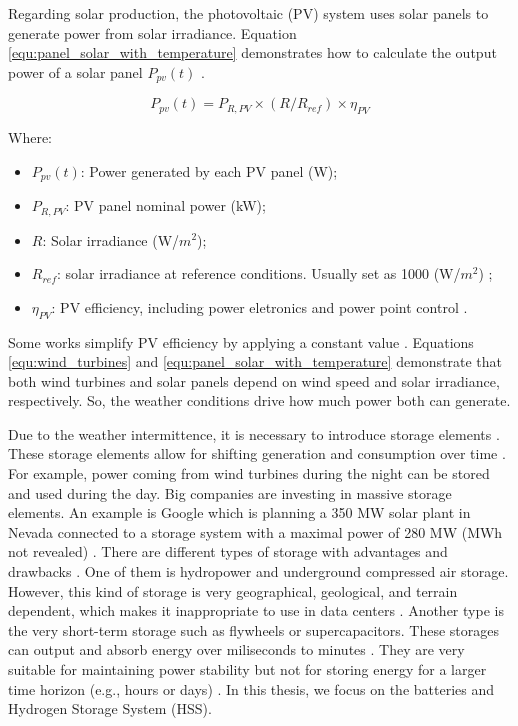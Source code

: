 Regarding solar production, the photovoltaic (PV) system uses solar panels to generate power from solar irradiance. Equation \ref{equ:panel_solar_with_temperature} demonstrates how to calculate the output power of a solar panel $P_{pv}(t)$ \cite{maleki2015optimal, sinha2015review, dong2016optimal}.

\begin{equation}
    \label{equ:panel_solar_with_temperature}
    P_{pv}(t) = P_{R,PV} \times (R / R_{ref}) \times \eta_{PV}
\end{equation}

Where:
\begin{itemize}
    \item $P_{pv}(t)$: Power generated by each PV panel (W);
    \item $P_{R,PV}$: PV panel nominal power (kW);
    \item $R$: Solar irradiance (W/$m^{2}$);
    \item $R_{ref}$: solar irradiance at reference conditions. Usually set as 1000 (W/$m^{2}$) \cite{dong2016optimal};
    \item $\eta_{PV}$: PV efficiency, including power eletronics and power point control \cite{sinha2015review, maleki2015optimal}.
\end{itemize}

Some works simplify PV efficiency by applying a constant value \cite{dong2016optimal, haddad2019mixed}. Equations \ref{equ:wind_turbines} and \ref{equ:panel_solar_with_temperature} demonstrate that both wind turbines and solar panels depend on wind speed and solar irradiance, respectively. So, the weather conditions drive how much power both can generate. 

Due to the weather intermittence, it is necessary to introduce storage elements \cite{hernandez2019techno}. These storage elements allow for shifting generation and consumption over time \cite{rostirolla2022survey}. For example, power coming from wind turbines during the night can be stored and used during the day. Big companies are investing in massive storage elements. An example is Google which is planning a 350 MW solar plant in Nevada connected to a storage system with a maximal power of 280 MW (MWh not revealed) \cite{branscombe2020google}. There are different types of storage with advantages and drawbacks \cite{wang2012energy}. One of them is hydropower and underground compressed air storage. However, this kind of storage is very geographical, geological, and terrain dependent, which makes it inappropriate to use in data centers \cite{rostirolla2022survey}. Another type is the very short-term storage such as flywheels or supercapacitors. These storages can output and absorb energy over miliseconds to minutes \cite{wang2012energy}. They are very suitable for maintaining power stability but not for storing energy for a larger time horizon (e.g., hours or days) \cite{rostirolla2022survey}. In this thesis, we focus on the batteries and Hydrogen Storage System (HSS).

